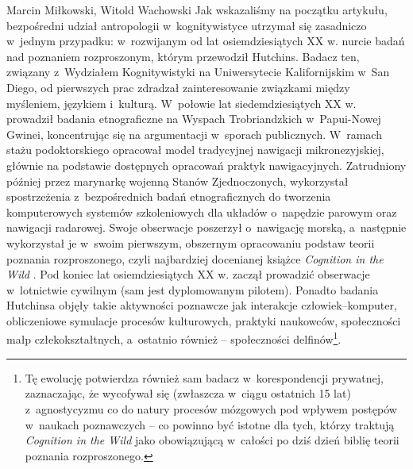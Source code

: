 \begin{artplenv2auth}{Marcin Miłkowski, Witold Wachowski}
Jak wskazaliśmy na początku artykułu, bezpośredni udział antropologii w~kognitywistyce utrzymał się zasadniczo w~jednym przypadku: w~rozwijanym od lat osiemdziesiątych XX w. nurcie badań nad poznaniem rozproszonym, którym przewodził Hutchins. Badacz ten, związany z~Wydziałem Kognitywistyki na Uniwersytecie Kalifornijskim w~San Diego, od pierwszych prac zdradzał zainteresowanie związkami między myśleniem, językiem i~kulturą. W~połowie lat siedemdziesiątych XX w. prowadził badania etnograficzne na Wyspach Trobriandzkich w~Papui-Nowej Gwinei, koncentrując się na argumentacji w~sporach publicznych. W~ramach stażu podoktorskiego opracował model tradycyjnej nawigacji mikronezyjskiej, głównie na podstawie dostępnych opracowań praktyk nawigacyjnych. Zatrudniony później przez marynarkę wojenną Stanów Zjednoczonych, wykorzystał spostrzeżenia z~bezpośrednich badań etnograficznych do tworzenia komputerowych systemów szkoleniowych dla układów o~napędzie parowym oraz nawigacji radarowej. Swoje obserwacje poszerzył o~nawigację morską, a~następnie wykorzystał je w~swoim pierwszym, obszernym opracowaniu podstaw teorii poznania rozproszonego, czyli najbardziej docenianej książce \textit{Cognition in the Wild}
\parencite*[][]{hutchins_cognition_1995}. %
 Pod koniec lat osiemdziesiątych XX w. zaczął prowadzić obserwacje w~lotnictwie cywilnym (sam jest dyplomowanym pilotem). Ponadto badania Hutchinsa objęły takie aktywności poznawcze jak interakcje człowiek–komputer, obliczeniowe symulacje procesów kulturowych, praktyki naukowców, społeczności małp człekokształtnych, a~ostatnio również -- społeczności delfinów\footnote{Tę ewolucję potwierdza również sam badacz w~korespondencji prywatnej, zaznaczając, że wycofywał się (zwłaszcza w~ciągu ostatnich 15 lat) z~agnostycyzmu co do natury procesów mózgowych pod wpływem postępów w~naukach poznawczych -- co powinno być istotne dla tych, którzy traktują \textit{Cognition in the Wild} 
\parencite*[][]{hutchins_cognition_1995} %
 jako obowiązującą w~całości po dziś dzień biblię teorii poznania rozproszonego.}.


\end{artplenv2auth}
